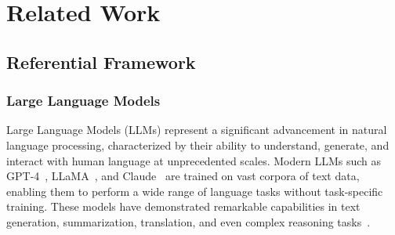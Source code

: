 \chapter{Related Work}
\label{cha:sota}



\section{Referential Framework}
\subsection{Large Language Models}
Large Language Models (LLMs) represent a significant advancement 
in natural language processing, characterized by their ability to 
understand, generate, and interact with human language at unprecedented 
scales. Modern LLMs such as GPT-4~\cite{openai2023}, LLaMA~\cite{grattafiori2024llama3herdmodels}, 
and Claude~\cite{anthropic2023} are trained on vast corpora of text data, 
enabling them to perform a wide range of language tasks without task-specific training. 
These models have demonstrated remarkable capabilities in text generation, summarization, translation, 
and even complex reasoning tasks~\cite{brown2020}.
